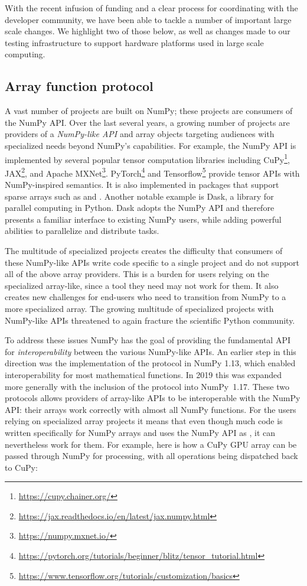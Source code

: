 With the recent infusion of funding and a clear process for coordinating with
the developer community, we have been able to tackle a number of important
large scale changes.
We highlight two of those below, as well as changes made to our testing
infrastructure to support hardware platforms used in large scale computing.

\subsection*{Array function protocol}

A vast number of projects are built on NumPy;
these projects are consumers of the NumPy API.
Over the last several years, a growing number of projects are providers of
a \emph{NumPy-like API} and array objects targeting audiences with specialized
needs beyond NumPy's capabilities.
For example, the NumPy API is implemented by several popular tensor computation
libraries including CuPy\footnote{\url{https://cupy.chainer.org/}},
JAX\footnote{\url{https://jax.readthedocs.io/en/latest/jax.numpy.html}},
and Apache MXNet\footnote{\url{https://numpy.mxnet.io/}}.
PyTorch\footnote{\url{https://pytorch.org/tutorials/beginner/blitz/tensor\_tutorial.html}}
and Tensorflow\footnote{\url{https://www.tensorflow.org/tutorials/customization/basics}}
provide tensor APIs with NumPy-inspired semantics.
It is also implemented in packages that support sparse arrays
such as  and .
Another notable example is Dask, a library for parallel computing in
Python.  Dask adopts the NumPy API and therefore presents a familiar
interface to existing NumPy users, while adding powerful abilities to
parallelize and distribute tasks.

The multitude of specialized projects creates the difficulty that consumers
of these NumPy-like APIs write code specific to a single project and do not support
all of the above array providers.
This is a burden for users relying on the specialized array-like, since
a tool they need may not work for them.
It also creates new challenges for end-users who need to transition
from NumPy to a more specialized array.
The growing multitude of specialized projects with NumPy-like APIs threatened
to again fracture the scientific Python community.

To address these issues NumPy has the goal of providing the fundamental
API for \emph{interoperability} between the various NumPy-like APIs.
An earlier step in this direction was the implementation of the
 protocol in NumPy 1.13, which enabled interoperability
for most mathematical functions.\cite{NEP13}
In 2019 this was expanded more generally with the inclusion of the
 protocol into NumPy~1.17.
These two protocols allows providers of array-like APIs to be interoperable
with the NumPy API: their arrays work correctly with almost all NumPy functions.\cite{NEP18}
For the users relying on specialized array projects it means that even though
much code is written specifically for NumPy arrays and uses the NumPy API as
, it can nevertheless work for them.
For example, here is how a CuPy GPU array can be passed through NumPy for
processing, with all operations being dispatched back to CuPy:

